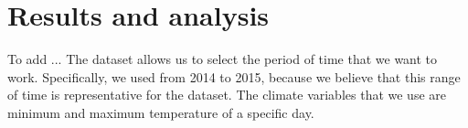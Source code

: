 

\section{Results and analysis}
\label{sec:results}
To add ...
The dataset allows us to select the period of time that we want to work. Specifically, we used from 2014 to 2015, because we believe that this range of time is representative for the dataset. The climate variables that we use are minimum and maximum temperature of a specific day.